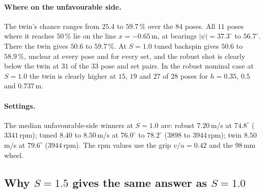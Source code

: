 \paragraph{Where on the unfavourable side.} The twin's chance ranges from $25.4$\predicted{} to
$59.7\,\%$\predicted{} over the $84$ poses. All $11$\predicted{} poses where it reaches $50\,\%$ lie on the
line $x=-0.65$\,\unit{m}\assumed, at bearings $|\psi|=37.3^\circ$\derived{} to $56.7^\circ$\derived. There the
twin gives $50.6$\predicted{} to $59.7\,\%$\predicted. At $S=1.0$ tuned backspin gives $50.6$\predicted{} to
$58.9\,\%$\predicted, unclear at every pose and for every set, and the robust shot is clearly below the twin at
$31$\predicted{} of the $33$ pose and set pairs. In the robust nominal case at $S=1.0$ the twin is clearly higher at
$15$\predicted, $19$\predicted{} and $27$\predicted{} of $28$ poses for $h=0.35$\assumed, $0.5$\assumed{}
and $0.737$\,\unit{m}\assumed.

\paragraph{Settings.} The median unfavourable-side winners at $S=1.0$ are: robust $7.20$\,\unit{m/s}\predicted{}
at $74.8^\circ$\predicted{} ($3341$\,rpm\derived); tuned $8.40$\predicted{} to $8.50$\,\unit{m/s}\predicted{}
at $76.0^\circ$\predicted{} to $78.2^\circ$\predicted{} ($3898$\derived{} to $3944$\,rpm\derived); twin
$8.50$\,\unit{m/s}\predicted{} at $79.6^\circ$\predicted{} ($3944$\,rpm\derived). The rpm values use the grip
$v/u=0.42$\assumed{} and the $98$\,\unit{mm}\userval{} wheel.

\subsection{Why \texorpdfstring{$S=1.5$}{S = 1.5} gives the same answer as \texorpdfstring{$S=1.0$}{S = 1.0}}
\label{sec:svt-sat}

